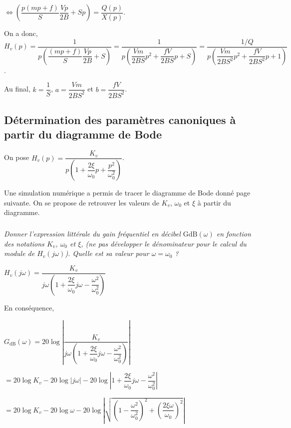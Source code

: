 \documentclass[10pt,fleqn]{article} %
\begin{document}
\begin{multicols}{2}
\begin{corrige}
$\Longleftrightarrow
\left(\dfrac{p\left(mp+f\right)}{S} \dfrac{Vp}{2B}+Sp \right) =
\dfrac{Q(p)}{ X(p)}$.


On a donc, 
$H_v(p)
=\dfrac{1}{p\left(\dfrac{\left(mp+f\right)}{S} \dfrac{Vp}{2B}+S \right)}
=\dfrac{1}{p\left(\dfrac{Vm}{2BS}p^2+ \dfrac{fV}{2BS}p+S \right)}
=\dfrac{1/Q}{p\left(\dfrac{Vm}{2BS^2}p^2+ \dfrac{fV}{2BS^2}p+1 \right)}
$.

Au final, $k=\dfrac{1}{S}$, $a=\dfrac{Vm}{2BS^2}$ et $b=\dfrac{fV}{2BS^2}$.
\end{corrige} \else \fi

\subsection*{Détermination des paramètres canoniques à partir du diagramme de Bode}
\ifprof
\else
On pose $H_v(p)=\dfrac{K_v}{p\left( 1+\dfrac{2\xi}{\omega_0} p + \dfrac{p^2}{\omega_0^2} \right)}$. 

Une simulation numérique a permis de tracer le diagramme de Bode donné page suivante. On se propose de retrouver les valeurs de $K_v$, $\omega_0$ et $\xi$ à partir du diagramme.

\fi

\subparagraph{}\textit{Donner l'expression littérale du gain fréquentiel en décibel $\text{GdB}(\omega)$ en fonction des notations $K_v$, $\omega_0$ et $\xi$, (ne pas développer le dénominateur pour le calcul du module de $H_v(j\omega)$). Quelle est sa valeur pour $\omega=\omega_0$ ?}

\ifprof \begin{corrige}
$H_v(j\omega )=\dfrac{K_v}{j\omega\left( 1+\dfrac{2\xi}{\omega_0} j\omega - \dfrac{\omega^2}{\omega_0^2} \right)}$

En conséquence, 

$
G_{\text{dB}}\left(\omega \right)=20\log\left| \dfrac{K_v}{j\omega\left( 1+\dfrac{2\xi}{\omega_0} j\omega - \dfrac{\omega^2}{\omega_0^2} \right)} \right|
$

$
=20\log K_v- 20\log  \left| j\omega\right| - 20\log  \left| 1+\dfrac{2\xi}{\omega_0} j\omega - \dfrac{\omega^2}{\omega_0^2}  \right|
$

$
=20\log K_v- 20\log  \omega - 20\log  \left| \sqrt{\left(1- \dfrac{\omega^2}{\omega_0^2} \right)^2+\left( \dfrac{2\xi\omega }{\omega_0} \right)^2} \right|
$


\end{corrige}
\end{multicols}
\end{document}
